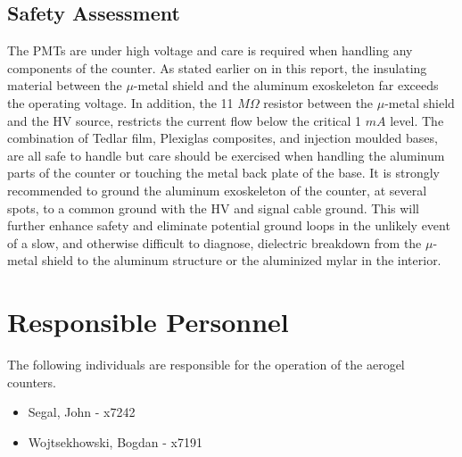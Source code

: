 \begin{safetyen}{10}{10}
\section{Safety Assessment}

The PMTs are under high voltage and care is required when handling any 
components of the counter. As stated earlier on in this report, the insulating 
material between the $\mu$-metal shield and the aluminum exoskeleton far 
exceeds the operating voltage. In addition, the 11 $M\Omega$ resistor between 
the $\mu$-metal shield and the HV source, restricts the current flow below the  
critical 1 $mA$ level. The combination of Tedlar film, Plexiglas composites, 
and injection moulded bases, are all safe to handle but care should be 
exercised when handling the aluminum parts of the counter or touching the metal 
back plate of the base. It is strongly recommended to ground the aluminum 
exoskeleton of the counter, at several spots, to a common ground with the HV 
and signal cable ground. This will further enhance safety and eliminate 
potential ground loops in the unlikely event of a slow, and otherwise difficult 
to diagnose, dielectric breakdown from the $\mu$-metal shield to the aluminum 
structure or the aluminized mylar in the interior.  

\end{safetyen}

\section{Responsible Personnel} 
The following individuals are responsible for the operation 
of the aerogel \Cherenkov{} counters.
 
\begin{itemize}
\item[~]Segal, John - x7242 
\item[~]Wojtsekhowski, Bogdan - x7191 
\end{itemize} 

%

